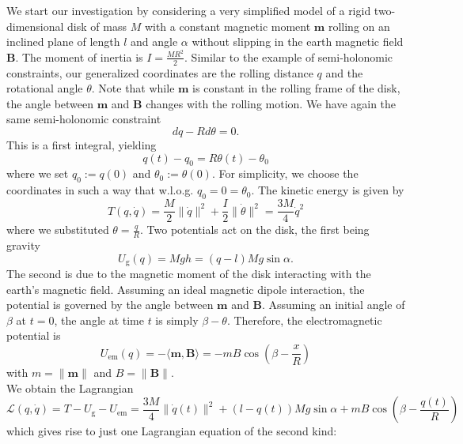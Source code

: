 \begin{marginfigure}
    \centering
    
    \caption{A sketch of the considered system. The vector $\mathbf{m}|_0$ denotes the magnetic moment at $t=0$. One can see that the angle between $\mathbf{m}$ and $\mathbf{B}$ at any point in time is the difference between $\beta$ and $\theta$. Since $\cos$ is symmetric on $\mathbb{R}$, the change of sign as $\mathbf{m}$ passes $\mathbf{B}$ is not of concern.} 
    \label{fig:2dramp}
\end{marginfigure}
We start our investigation by considering a very simplified model of a rigid two-dimensional disk of mass $M$ with a constant magnetic moment $\mathbf{m}$ rolling on an inclined plane of length $l$ and angle $\alpha$ without slipping in the earth magnetic field $\mathbf{B}$. The moment of inertia is $I=\frac{MR^2}{2}$. Similar to the example of semi-holonomic constraints, our generalized coordinates are the rolling distance $q$ and the rotational angle $\theta$. Note that while $\mathbf{m}$ is constant in the rolling frame of the disk, the angle between $\mathbf{m}$ and $\mathbf{B}$ changes with the rolling motion. We have again the same semi-holonomic constraint 
\[
dq-Rd\theta = 0
.\] This is a first integral, yielding \[
q(t) - q_0= R\theta(t) - \theta_0 
\] where we set $q_0:=q(0)$ and $\theta_0 := \theta(0)$. For simplicity, we choose the coordinates in such a way that w.l.o.g. $q_0=0=\theta_0$. The kinetic energy is given by
\[
    T(q, \dot{q}) = \frac{M}{2} \|\dot{q}\|^2 + \frac{I}{2} \|\dot{\theta}\|^2 = \frac{3M}{4} \dot{q}^2
\] where we substituted $\theta = \frac{q}{R}$. Two potentials act on the disk, the first being gravity
\[
    U_\text{g}(q) = Mgh = (q-l)Mg \sin \alpha
.\] The second is due to the magnetic moment of the disk interacting with the earth's magnetic field. Assuming an ideal magnetic dipole interaction, the potential is governed by the angle between $\mathbf{m}$ and $\mathbf{B}$. 
Assuming an initial angle of $\beta$ at $t=0$, the angle at time $t$ is simply $\beta - \theta$. Therefore, the electromagnetic potential is
\[
    U_\text{em}(q)=- \langle \mathbf{m}, \mathbf{B} \rangle = -mB\cos\left(\beta - \frac{x}{R}\right)
\] with $m=\|\mathbf{m}\|$ and $B=\|\mathbf{B}\|$.\\
We obtain the Lagrangian
\[
    \mathcal{L}(q,\dot{q})= T-U_\text{g}-U_\text{em}= \frac{3M}{4} \|\dot{q}(t)\|^2+ (l-q(t))Mg\sin \alpha + mB \cos\left(\beta - \frac{q(t)}{R}\right)
\] which gives rise to just one Lagrangian equation of the second kind:
